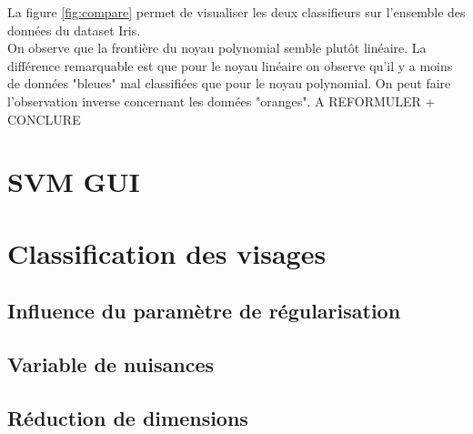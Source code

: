 \documentclass[a4paper,12pt]{article}
\begin{document}
La figure \ref{fig:compare} permet de visualiser les deux classifieurs sur l'ensemble des données du dataset Iris.\\
On observe que la frontière du noyau polynomial semble plutôt linéaire.
La différence remarquable est que pour le noyau linéaire on observe qu'il y a moins de données "bleues" mal classifiées que pour le noyau polynomial.
On peut faire l'observation inverse concernant les données "oranges".
A REFORMULER + CONCLURE 

\section{SVM GUI}

\section{Classification des visages}

\subsection{Influence du paramètre de régularisation}

\subsection{Variable de nuisances}

\subsection{Réduction de dimensions}
\end{document}
